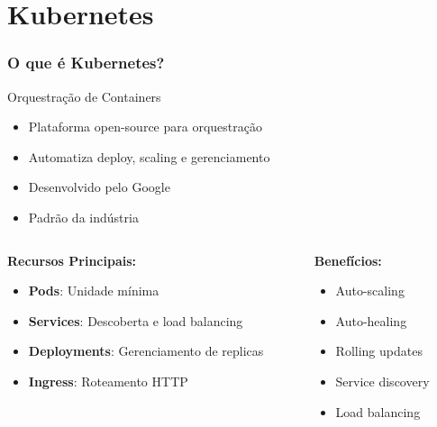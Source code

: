 \documentclass[aspectratio=169]{beamer}
\begin{document}
\section{Kubernetes}

\begin{frame}
    \frametitle{O que é Kubernetes?}
    \begin{block}{Orquestração de Containers}
        \begin{itemize}
            \item Plataforma open-source para orquestração
            \item Automatiza deploy, scaling e gerenciamento
            \item Desenvolvido pelo Google
            \item Padrão da indústria
        \end{itemize}
    \end{block}
    
    \begin{columns}
        \begin{column}{0.5\textwidth}
            \textbf{Recursos Principais:}
            \begin{itemize}
                \item \textbf{Pods}: Unidade mínima
                \item \textbf{Services}: Descoberta e load balancing
                \item \textbf{Deployments}: Gerenciamento de replicas
                \item \textbf{Ingress}: Roteamento HTTP
            \end{itemize}
        \end{column}
        \begin{column}{0.5\textwidth}
            \textbf{Benefícios:}
            \begin{itemize}
                \item Auto-scaling
                \item Auto-healing
                \item Rolling updates
                \item Service discovery
                \item Load balancing
            \end{itemize}
        \end{column}
    \end{columns}
\end{frame}
\end{document}
